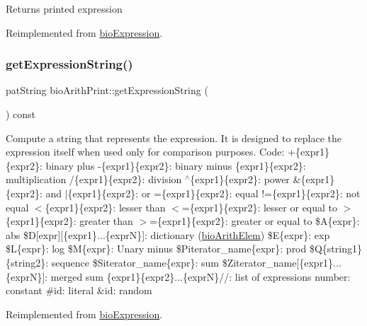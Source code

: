 \begin{DoxyReturn}{Returns}
printed expression 
\end{DoxyReturn}


Reimplemented from \hyperlink{classbio_expression_a66a83eb0caac18dd5e568ffde5a8b5d4}{bio\+Expression}.

\mbox{\label{classbio_arith_print_ac850d47bf3a4d8dcf10d4b943a325103}} 
\subsubsection{\texorpdfstring{get\+Expression\+String()}{getExpressionString()}}
{\footnotesize\ttfamily pat\+String bio\+Arith\+Print\+::get\+Expression\+String (\begin{DoxyParamCaption}{ }\end{DoxyParamCaption}) const\hspace{0.3cm}{\ttfamily [virtual]}}

Compute a string that represents the expression. It is designed to replace the expression itself when used only for comparison purposes. Code\+: +\{expr1\}\{expr2\}\+: binary plus -\/\{expr1\}\{expr2\}\+: binary minus \{expr1\}\{expr2\}\+: multiplication /\{expr1\}\{expr2\}\+: division $^\wedge$\{expr1\}\{expr2\}\+: power \&\{expr1\}\{expr2\}\+: and $\vert$\{expr1\}\{expr2\}\+: or =\{expr1\}\{expr2\}\+: equal !=\{expr1\}\{expr2\}\+: not equal $<$\{expr1\}\{expr2\}\+: lesser than $<$=\{expr1\}\{expr2\}\+: lesser or equal to $>$\{expr1\}\{expr2\}\+: greater than $>$=\{expr1\}\{expr2\}\+: greater or equal to \$A\{expr\}\+: abs \$D\mbox{[}expr\mbox{]}\mbox{[}\{expr1\}...\{exprN\}\mbox{]}\+: dictionary (\hyperlink{classbio_arith_elem}{bio\+Arith\+Elem}) \$E\{expr\}\+: exp \$L\{expr\}\+: log \$M\{expr\}\+: Unary minus \$\+Piterator\+\_\+name\{expr\}\+: prod \$Q\{string1\}\{string2\}\+: sequence \$\+Siterator\+\_\+name\{expr\}\+: sum \$\+Ziterator\+\_\+name\mbox{[}\{expr1\}...\{exprN\}\mbox{]}\+: merged sum \{expr1\}\{expr2\}...\{exprN\}//\+: list of expressions number\+: constant \#id\+: literal \&id\+: random 

Reimplemented from \hyperlink{classbio_expression_a3e4b4dca58dbbc6f0e411b30eb3f60b4}{bio\+Expression}.

\mbox{\label{classbio_arith_print_a22180a362c2407a7941b465598981e96}} 

